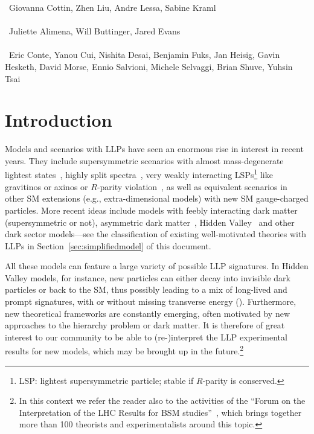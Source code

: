 ~Giovanna Cottin, Zhen Liu, Andre Lessa, Sabine Kraml\\
\text{ \; }\\
~Juliette Alimena, Will Buttinger, Jared Evans\\
\text{ \; }\\
~Eric Conte, Yanou Cui, Nishita Desai, Benjamin Fuks, Jan Heisig, Gavin Hesketh, David Morse, Ennio Salvioni, Michele Selvaggi, Brian Shuve, Yuhsin Tsai
\text{ \; }\\

\section{Introduction}
\label{sec:ch5-introduction}

Models and scenarios with LLPs have seen an enormous rise in interest in recent years.
They include supersymmetric scenarios with almost mass-degenerate lightest states~\cite{Chen:1995yu,Feng:1999fu}, highly split spectra~\cite{ArkaniHamed:2004fb,Giudice:2004tc}, very weakly interacting LSPs\footnote{LSP: lightest supersymmetric particle; stable if $R$-parity is conserved.} like gravitinos or axinos \cite{Pagels:1981ke,Covi:1999ty} or $R$-parity violation~\cite{Barbier:2004ez}, as well as equivalent scenarios in other SM extensions (e.g., extra-dimensional models) with new SM gauge-charged particles. 
More recent ideas include models with feebly interacting dark matter \cite{Hall:2009bx} (supersymmetric or not), asymmetric dark matter~\cite{Zurek:2013wia}, Hidden Valley~\cite{Strassler:2006im} and other dark sector models---see the classification of existing well-motivated theories with LLPs in Section~\ref{sec:simplifiedmodel} of this document.

All these models can feature a large variety of possible LLP signatures. In Hidden Valley models, for instance,   
new particles can either decay into invisible dark particles or back to the SM, thus possibly leading to a 
mix of long-lived and prompt signatures, with or without missing transverse energy (\MET). 
Furthermore, new theoretical frameworks are constantly emerging, often motivated by 
new approaches to the hierarchy problem or dark matter. 
It is therefore of great interest to our community to be able to (re-)interpret the LLP experimental results 
for new models, which may be brought up in the future.\footnote{In this context we refer the reader also to 
the activities of the ``Forum on the Interpretation of the LHC Results for BSM studies''~\cite{reinterpretationForum}, which brings together more than 
100 theorists and experimentalists around this topic.}


